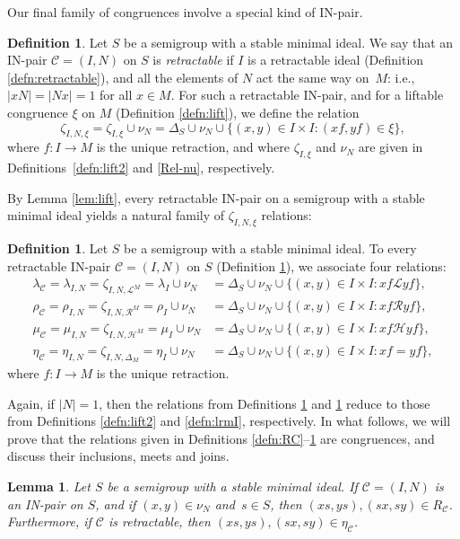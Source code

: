 \documentclass[11pt,a4paper]{article}
\newcommand{\C}{\mathscr C}
\renewcommand{\H}{\mathrel{\mathscr H}}
\renewcommand{\L}{\mathrel{\mathscr L}}
\newcommand{\R}{\mathrel{\mathscr R}}
\newcommand{\lam}{\lambda}
\newcommand{\De}{\Delta}
\newcommand{\set}[2]{\{ {#1} : {#2} \}}
\newcommand{\1}{\id_n}
\numberwithin{equation}{section}
\newtheorem{lemma}[equation]{Lemma}
\theoremstyle{definition}
\newtheorem{defn}[equation]{Definition}
\begin{document}
Our final family of congruences involve a special kind of IN-pair.

\begin{defn}
\label{defn:lrmC0}
Let $S$ be a semigroup with a stable minimal ideal.
  We say that an IN-pair $\C=(I,N)$ on $S$ is
  \emph{retractable} if $I$ is a retractable ideal (Definition \ref{defn:retractable}), and all the elements of $N$ act the same way on~$M$: i.e., $|xN|=|Nx|=1$ for all $x\in M$.
  For such a retractable IN-pair, and for a liftable congruence $\xi$ on $M$ (Definition \ref{defn:lift}), we
  define the relation
\[
\zeta_{I,N,\xi} = \zeta_{I,\xi}\cup\nu_N = \De_S\cup\nu_N\cup\set{(x,y)\in I\times I}{(xf,yf) \in \xi},
\]
where $f:I\to M$ is the unique retraction, and where $\zeta_{I, \xi}$ and $\nu_N$ are given in Definitions~\ref{defn:lift2} and \ref{Rel-nu}, respectively.
\end{defn}

By Lemma \ref{lem:lift}, every retractable IN-pair on a semigroup with a stable minimal ideal yields a natural family of $\zeta_{I,N,\xi}$ relations:

\begin{defn}
\label{defn:lrmC}
Let $S$ be a semigroup with a stable minimal ideal.  To every retractable IN-pair $\C=(I,N)$ on $S$ (Definition \ref{defn:lrmC0}), we associate four relations:
\begin{align*}
\lambda_\C=\lambda_{I,N}=\zeta_{I,N,{\L^M}}=\lam_I\cup\nu_N&=\Delta_S\cup\nu_N\cup\set{
  (x,y)\in I\times I}{ xf\L yf},\\
\rho_\C=\rho_{I,N}=\zeta_{I,N,{\R^M}}=\rho_I\cup\nu_N&=\Delta_S\cup\nu_N\cup\set{
  (x,y)\in I\times I}{ xf\R yf},\\
\mu_\C=\mu_{I,N}=\zeta_{I,N,{\H^M}}=\mu_I\cup\nu_N&=\Delta_S\cup\nu_N\cup\set{ (x,y)\in I\times I}{ xf\H yf},\\
\eta_\C=\eta_{I,N}=\zeta_{I,N,\De_M}=\eta_I\cup\nu_N&=\Delta_S\cup\nu_N\cup\set{ (x,y)\in I\times I}{ xf= yf},
\end{align*}
where $f:I\to M$ is the unique retraction.
\end{defn}

Again, if $|N|=1$, then the relations from Definitions \ref{defn:lrmC0} and
\ref{defn:lrmC} reduce to those from Definitions \ref{defn:lift2} and \ref{defn:lrmI}, respectively.  In what
follows, we will prove that the relations given in Definitions \ref{defn:RC}--\ref{defn:lrmC} are congruences, and discuss their inclusions, meets and
joins.

\begin{lemma}
\label{lem:nu}
Let $S$ be a semigroup with a stable minimal ideal.  If $\C=(I,N)$ is an IN-pair on $S$, and if $(x,y)\in\nu_N$ and~$s\in S$, then $(xs,ys),(sx,sy)\in R_\C$.  Furthermore, if $\C$ is retractable, then ${(xs,ys),(sx,sy)\in\eta_\C}$.
\end{lemma}
\end{document}
